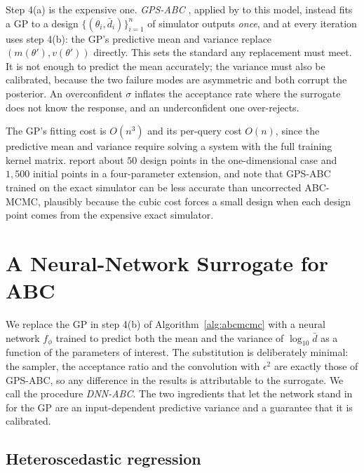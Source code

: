 \documentclass[sn-basic,iicol,pdflatex]{sn-jnl}
\newcommand{\dbar}{\ensuremath{\bar d}}
\begin{document}
Step 4(a) is the expensive one. \emph{GPS-ABC} \citep{meeds2014}, applied by
\citet{lu2023} to this model, instead fits a GP to a design
$\{(\theta_i, \dbar_i)\}_{i=1}^n$ of simulator outputs \emph{once}, and at every
iteration uses step 4(b): the GP's predictive mean and variance replace
$(m(\theta'), v(\theta'))$ directly. This sets the standard any replacement
must meet. It is not enough to predict the mean accurately; the variance must
also be calibrated, because the two failure modes are asymmetric and both
corrupt the posterior. An overconfident $\sigma$ inflates the acceptance rate
where the surrogate does not know the response, and an underconfident one
over-rejects.

The GP's fitting cost is $O(n^3)$ and its per-query cost $O(n)$, since the
predictive mean and variance require solving a system with the full training
kernel matrix. \citet{lu2023} report about $50$ design points in the
one-dimensional case and $1{,}500$ initial points in a four-parameter extension,
and note that GPS-ABC trained on the exact simulator can be less accurate than
uncorrected ABC-MCMC, plausibly because the cubic cost forces a small design
when each design point comes from the expensive exact simulator.

\section{A Neural-Network Surrogate for ABC}
\label{sec:method}

We replace the GP in step 4(b) of Algorithm~\ref{alg:abcmcmc} with a neural
network $f_\phi$ trained to predict both the mean and the variance of
$\log_{10}\dbar$ as a function of the parameters of interest. The substitution
is deliberately minimal: the sampler, the acceptance ratio and the convolution
with $\epsilon^2$ are exactly those of GPS-ABC, so any difference in the results
is attributable to the surrogate. We call the procedure \emph{DNN-ABC}. The two
ingredients that let the network stand in for the GP are an input-dependent
predictive variance and a guarantee that it is calibrated.

\subsection{Heteroscedastic regression}
\label{sec:hetero}
\end{document}
